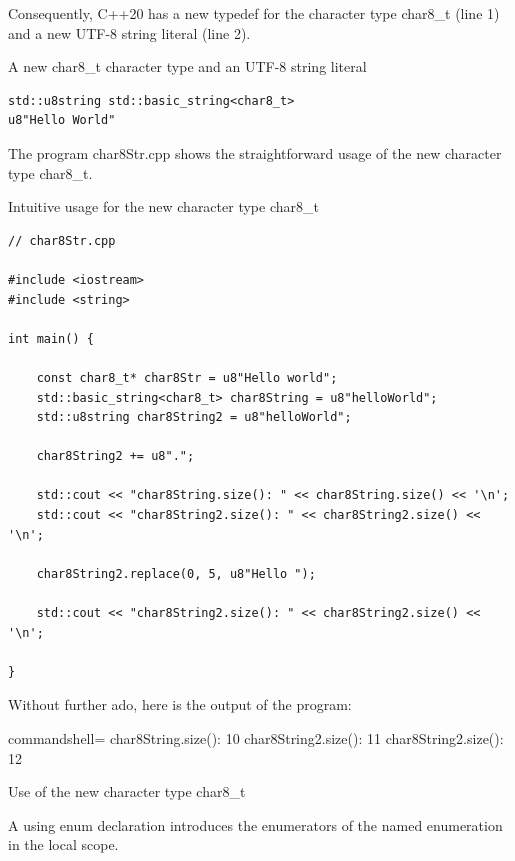 Consequently, C++20 has a new typedef for the character type char8\_t (line 1) and a new UTF-8 string literal (line 2).

\noindent
A new char8\_t character type and an UTF-8 string literal
\begin{lstlisting}[style=styleCXX]
std::u8string std::basic_string<char8_t>
u8"Hello World"
\end{lstlisting}

The program char8Str.cpp shows the straightforward usage of the new character type char8\_t.

\noindent
Intuitive usage for the new character type char8\_t
\begin{lstlisting}[style=styleCXX]
// char8Str.cpp

#include <iostream>
#include <string>

int main() {
	
	const char8_t* char8Str = u8"Hello world";
	std::basic_string<char8_t> char8String = u8"helloWorld";
	std::u8string char8String2 = u8"helloWorld";
	
	char8String2 += u8".";
	
	std::cout << "char8String.size(): " << char8String.size() << '\n';
	std::cout << "char8String2.size(): " << char8String2.size() << '\n';
	
	char8String2.replace(0, 5, u8"Hello ");
	
	std::cout << "char8String2.size(): " << char8String2.size() << '\n';

}
\end{lstlisting}

Without further ado, here is the output of the program:

\begin{tcblisting}{commandshell={}}
char8String.size(): 10
char8String2.size(): 11
char8String2.size(): 12
\end{tcblisting}

\begin{center}
Use of the new character type char8\_t
\end{center}


A using enum declaration introduces the enumerators of the named enumeration in the local scope.

